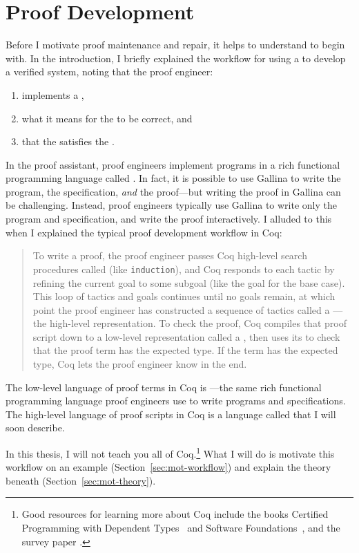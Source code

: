 \section{Proof Development}
\label{sec:mot-dev}

Before I motivate proof maintenance and repair, it helps to understand  to begin with.
In the introduction, I briefly explained the workflow for using a  to develop a verified system,
noting that the proof engineer:

\begin{enumerate}
\item implements a ,
\item {} what it means for the  to be correct, and
\item {} that the  satisfies the .
\end{enumerate}
In the  proof assistant, proof engineers implement programs in a rich functional programming language called .
In fact, it is possible to use Gallina to write the program, the specification, \textit{and} the proof---but writing the proof in Gallina can be challenging.
Instead, proof engineers typically use Gallina to write only the program and specification,
and write the proof interactively.
I alluded to this when I explained the typical proof development workflow in Coq:

\begin{quote}
To write a proof, the proof engineer passes Coq high-level search procedures called  (like \lstinline{induction}), and Coq responds to each tactic
by refining the current goal to some subgoal (like the goal for the base case). This loop of tactics and goals 
continues until no goals remain, at which point the proof engineer has constructed a sequence of tactics called a ---the
high-level representation.
To check the proof, Coq compiles that proof script down to a low-level representation called a ,
then uses its  to check that the proof term has the expected type.
If the term has the expected type, Coq lets the proof engineer know in the end.
\end{quote}
The low-level language of proof terms in Coq is ---the same rich functional programming language proof engineers use to write programs and specifications.
The high-level language of proof scripts in Coq is a language called  that I will soon describe.

In this thesis, I will not teach you all of Coq.\footnote{Good resources 
for learning more about Coq include the books Certified Programming with Dependent Types~\cite{chlipala:cpdt} and
Software Foundations~\cite{software-foundations}, and the survey paper .}
What I will do is motivate this workflow on an example (Section~\ref{sec:mot-workflow})
and explain the theory beneath (Section~\ref{sec:mot-theory}).





